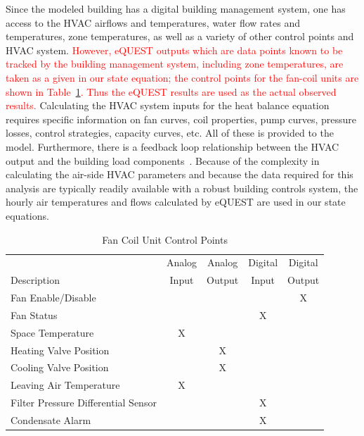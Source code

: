 Since the modeled building has a digital building management system, one has access to the HVAC airflows and temperatures, water flow rates and temperatures, zone temperatures, as well as a variety of other control points and HVAC system. \textcolor{red}{However, eQUEST outputs which are data points known to be tracked by the building management system, including zone temperatures, are taken as a given in our state equation; the control points for the fan-coil units are shown in Table~\ref{controls}.  Thus the eQUEST results are used as the actual observed results.}  Calculating the HVAC system inputs for the heat balance equation requires specific information on fan curves, coil properties, pump curves, pressure losses, control strategies, capacity curves, etc. All of these is provided to the model. Furthermore, there is a feedback loop relationship between the HVAC output and the building load components~\citep{he2016simplified}. Because of the complexity in calculating the air-side HVAC parameters and because the data required for this analysis are typically readily available with a robust building controls system, the hourly air temperatures and flows calculated by eQUEST are used in our state equations.  

\begin{table}[H]
\begin{center}
\caption{Fan Coil Unit Control Points\\}
\small
\begin{tabular}{|l|c|c|c|c|}
\hline
& Analog & Analog & Digital & Digital \\ 
Description & Input & Output & Input & Output\\ 
\hline \hline
Fan Enable/Disable & & & & X\\
\hline
Fan Status & & & X & \\
\hline
Space Temperature & X & & &\\
\hline
Heating Valve Position & & X & & \\
\hline
Cooling Valve Position & & X & & \\
\hline
Leaving Air Temperature & X & & & \\
\hline
Filter Pressure Differential Sensor & & & X & \\
\hline
Condensate Alarm & & & X & \\
\hline
\end{tabular}
\label{controls}
\end{center}
\end{table}

